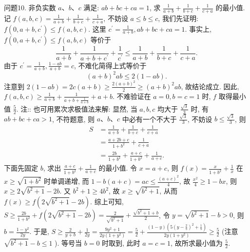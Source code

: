 问题10. 非负实数 $a 、 b 、 c$ 满足: $a b+b c+c a=1$, 求 $\frac{1}{a+b}+\frac{1}{b+c}+\frac{1}{c+a}$ 的最小值.
记 $f(a, b, c)=\frac{1}{a+b}+\frac{1}{b+c}+\frac{1}{c+a}$, 不妨设 $a \leqslant b \leqslant c$, 我们先证明: $f\left(0, a+b, c^{\prime}\right) \leqslant f(a, b, c)$. 这里 $c^{\prime}=\frac{1}{a+b}, a b+b c+c a=1$. 事实上, $f\left(0, a+b, c^{\prime}\right) \leqslant f(a, b, c)$ 等价于
$$
\frac{1}{a+b}+\frac{1}{a+b+c^{\prime}}+\frac{1}{c^{\prime}} \leqslant \frac{1}{a+b}+\frac{1}{b+c}+\frac{1}{c+a} .
$$
由于 $c^{\prime}=\frac{1}{a+b}, \frac{1-a b}{a+b}=c$, 不难化简得上式等价于
$$
(a+b)^2 a b \leqslant 2(1-a b) .
$$
注意到 $2(1-a b)=2 c(a+b) \geqslant \frac{2(a+b)^2}{2} \geqslant(a+b)^2 a b$, 故结论成立.
因此, $f(a, b, c) \geqslant \frac{1}{a+b}+\frac{1}{a+b+\frac{1}{a+b}}+a+b$.
不难验证在 $a=0, b=c=1$ 时, $f$ 取得最小值 $\frac{5}{2}$.
注:: 也可用累次求极值法来解:
显然, 当 $a, b, c$ 均大于 $\frac{\sqrt{3}}{3}$ 时, 有 $a b+b c+c a>1$, 不符题意, 则 $a 、 b 、 c$ 中必有一个不大于 $\frac{\sqrt{3}}{3}$, 不妨设 $b \leqslant \frac{\sqrt{3}}{3}$, 则
$$
\begin{aligned}
S & =\frac{1}{a+b}+\frac{1}{b+c}+\frac{1}{c+a} \\
& =\frac{a+2 b+c}{1+b^2}+\frac{1}{c+a} \\
& =\frac{2 b}{1+b^2}+\frac{a+c}{1+b^2}+\frac{1}{a+c} .
\end{aligned}
$$
下面先固定 $b$, 求出 $\frac{a+c}{1+b^2}+\frac{1}{a+c}$ 的最小值.
令 $x=a+c$, 则 $f(x)=\frac{x}{1+b^2}+\frac{1}{x}$ 在 $x \geqslant \sqrt{1+b^2}$ 时单调递增, 而 $1- b(a+c)=a c \leqslant \frac{(a+c)^2}{4}$, 故 $\frac{x^2}{4} \geqslant 1-b x$, 则 $x \geqslant 2 \sqrt{b^2+1}-2 b$. 又 $b^2+1 \geqslant 4 b^2$, 故 $x \geqslant \sqrt{b^2+1}$, 从而 $f(x) \geqslant f\left(2 \sqrt{b^2+1}-2 b\right)$.
综上可知, $S \geqslant \frac{2 b}{1+b^2}+f\left(2 \sqrt{b^2+1}-2 b\right)=\frac{2}{\sqrt{b^2+1}}+\frac{\sqrt{b^2+1}+b}{2}$, 令 $y=\sqrt{b^2+1}-b>0$, 则 $b=\frac{1-y^2}{2 y}$.
于是, $S \geqslant \frac{2}{y+b}+\frac{1}{2 y}=\frac{9 y^2+1}{2 y\left(1+y^2\right)}=\frac{5}{2}+\frac{(1-y)\left(5\left(y-\frac{2}{5}\right)^2+\frac{1}{5}\right)}{2 y\left(1+y^2\right)} \geqslant \frac{5}{2}$ (注意 $\sqrt{b^2+1}-b \leqslant 1$ ).
等号当 $b=0$ 时取到, 此时 $a=c=1$, 故所求最小值为 $\frac{5}{2}$.



